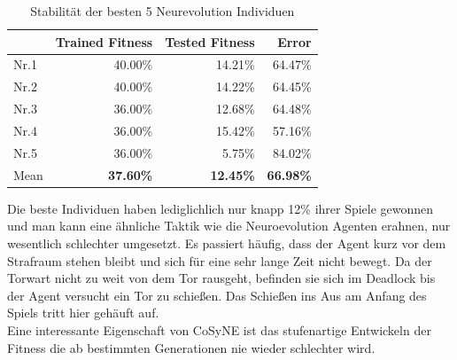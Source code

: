                 \begin{table}[H]
                    \begin{center}
                    \begin{tabular}{ |l|r|r|r| } 
                        \hline
                        \hfill & Trained Fitness   & Tested Fitness  &          Error    \\ \hline
                          Nr.1 &          40.00\%  &         14.21\% &          64.47\%  \\  
                          Nr.2 &          40.00\%  &         14.22\% &          64.45\%  \\  
                          Nr.3 &          36.00\%  &         12.68\% &          64.48\%  \\ 
                          Nr.4 &          36.00\%  &         15.42\% &          57.16\%  \\ 
                          Nr.5 &          36.00\%  &          5.75\% &          84.02\%  \\ \hline
                          Mean &  \textbf{37.60\%} & \textbf{12.45\%} & \textbf{66.98\%}  \\ \hline
                    \end{tabular}
                    \end{center}
                    \caption{Stabilität der besten 5 Neurevolution Individuen \label{fig:cosynetable}}
                \end{table}
                \noindent
                Die beste Individuen haben lediglichlich nur knapp 12\% ihrer Spiele gewonnen und man kann eine ähnliche Taktik wie die Neuroevolution Agenten erahnen, nur wesentlich schlechter umgesetzt. Es passiert häufig, dass der Agent kurz vor dem Strafraum stehen bleibt und sich für eine sehr lange Zeit nicht bewegt. Da der Torwart nicht zu weit von dem Tor rausgeht, befinden sie sich im Deadlock bis der Agent versucht ein Tor zu schießen. Das Schießen ins Aus am Anfang des Spiels tritt hier gehäuft auf.\\

                \noindent
                Eine interessante Eigenschaft von CoSyNE ist das stufenartige Entwickeln der Fitness die ab bestimmten Generationen nie wieder schlechter wird.

